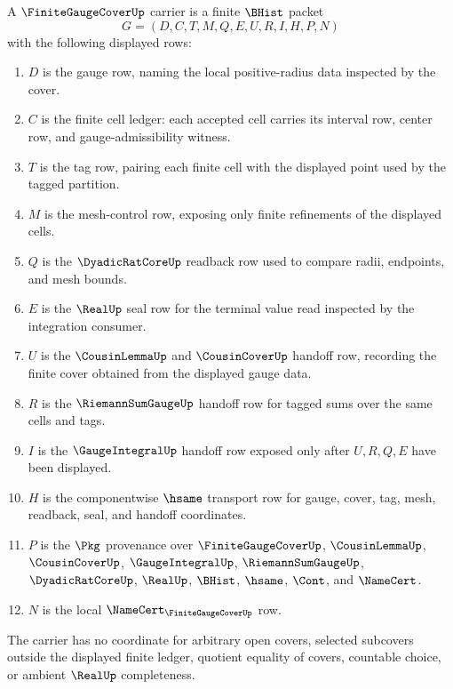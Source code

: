 \begin{definition}
\label{def:finite-gauge-cover-carrier}
A $\FiniteGaugeCoverUp$ carrier is a finite $\BHist$ packet
$$
G=(D,C,T,M,Q,E,U,R,I,H,P,N)
$$
with the following displayed rows:
\begin{enumerate}
  \item $D$ is the gauge row, naming the local positive-radius data inspected by the cover.
  \item $C$ is the finite cell ledger: each accepted cell carries its interval row, center row, and gauge-admissibility witness.
  \item $T$ is the tag row, pairing each finite cell with the displayed point used by the tagged partition.
  \item $M$ is the mesh-control row, exposing only finite refinements of the displayed cells.
  \item $Q$ is the $\DyadicRatCoreUp$ readback row used to compare radii, endpoints, and mesh bounds.
  \item $E$ is the $\RealUp$ seal row for the terminal value read inspected by the integration consumer.
  \item $U$ is the $\CousinLemmaUp$ and $\CousinCoverUp$ handoff row, recording the finite cover obtained from the displayed gauge data.
  \item $R$ is the $\RiemannSumGaugeUp$ handoff row for tagged sums over the same cells and tags.
  \item $I$ is the $\GaugeIntegralUp$ handoff row exposed only after $U,R,Q,E$ have been displayed.
  \item $H$ is the componentwise $\hsame$ transport row for gauge, cover, tag, mesh, readback, seal, and handoff coordinates.
  \item $P$ is the $\Pkg$ provenance over $\FiniteGaugeCoverUp$, $\CousinLemmaUp$, $\CousinCoverUp$, $\GaugeIntegralUp$, $\RiemannSumGaugeUp$, $\DyadicRatCoreUp$, $\RealUp$, $\BHist$, $\hsame$, $\Cont$, and $\NameCert$.
  \item $N$ is the local $\NameCert_{\FiniteGaugeCoverUp}$ row.
\end{enumerate}
The carrier has no coordinate for arbitrary open covers, selected subcovers outside the displayed finite ledger, quotient equality of covers, countable choice, or ambient $\RealUp$ completeness.
\end{definition}

